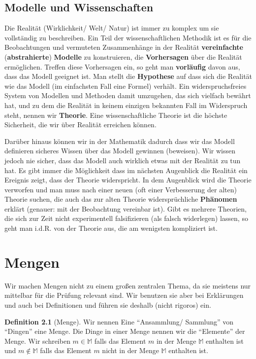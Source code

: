 \documentclass[a4paper]{book}%
\theoremstyle{definition}
\newtheorem{definition}{Definition}
\begin{document}
\section{Modelle und Wissenschaften}\label{ModelleUndWissenschaften}

Die Realität (Wirklichkeit/ Welt/ Natur) ist immer zu komplex um sie vollständig zu beschreiben. Ein Teil der wissenschaftlichen Methodik ist es für die Beobachtungen und vermuteten Zusammenhänge in der Realität \textbf{vereinfachte} (\textbf{abstrahierte}) \textbf{Modelle} zu konstruieren, die \textbf{Vorhersagen} über die Realität ermöglichen. Treffen diese Vorhersagen ein, so geht man \textbf{vorläufig} davon aus, dass das Modell geeignet ist. Man stellt die \textbf{Hypothese} auf dass sich die Realität wie das Modell (im einfachsten Fall eine Formel) verhält. Ein widerspruchsfreies System von Modellen und Methoden damit umzugehen, das sich vielfach bewährt hat, und zu dem die Realität in keinem einzigen bekannten Fall im Widerspruch steht, nennen wir \textbf{Theorie}. Eine wissenschaftliche Theorie ist die höchste Sicherheit, die wir über Realität erreichen können.

Darüber hinaus können wir in der Mathematik dadurch dass wir das Modell definieren sicheres Wissen über das Modell gewinnen (beweisen). Wir wissen jedoch nie sicher, dass das Modell auch wirklich etwas mit der Realität zu tun hat. Es gibt immer die Möglichkeit dass im nächsten Augenblick die Realität ein Ereignis zeigt, dass der Theorie widerspricht. In dem Augenblick wird die Theorie verworfen und man muss nach einer neuen (oft einer Verbesserung der alten) Theorie suchen, die auch das zur alten Theorie widersprüchliche \textbf{Phänomen} erklärt (genauer: mit der Beobachtung vereinbar ist). Gibt es mehrere Theorien, die sich zur Zeit nicht experimentell falsifizieren (als falsch widerlegen) lassen, so geht man i.d.R. von der Theorie aus, die am wenigsten kompliziert ist.


\chapter{Mengen}

Wir machen Mengen nicht zu einem großen zentralen Thema, da sie meistens nur mittelbar für die Prüfung relevant sind. Wir benutzen sie aber bei Erklärungen und auch bei Definitionen und führen sie deshalb (nicht rigoros) ein.

\begin{definition}[Menge]
    Wir nennen Eine \enquote{Ansammlung/ Sammlung} von \enquote{Dingen} eine Menge. Die Dinge in einer Menge nennen wir die \enquote{Elemente} der Menge. Wir schreiben $m \in \mathbb{M}$ falls das Element $m$ in der Menge $\mathbb{M}$ enthalten ist und $m \notin \mathbb{M}$ falls das Element $m$ nicht in der Menge $\mathbb{M}$ enthalten ist.
\end{definition}
\end{document}
